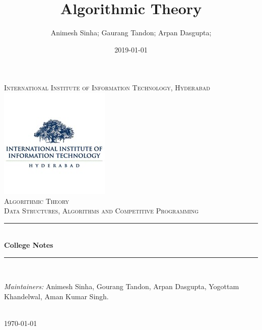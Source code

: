 \documentclass{book}
\title{Algorithmic Theory}
\date{2019-01-01}
\author{Animesh Sinha; Gaurang Tandon; Arpan Dasgupta; }
\newcounter{theo}[section]\setcounter{theo}{0}
\newcounter{prob}[section]\setcounter{prob}{0}
\begin{document}


\begin{titlepage}
    \newcommand{\HRule}{\rule{\linewidth}{0.5mm}}
    \center
    \textsc{\LARGE International Institute of Information Technology, Hyderabad}\\[0.5cm]
    \includegraphics[scale=1]{img/iiit-logo.jpeg}\\[0.5cm]
    \textsc{\Large Algorithmic Theory}\\[0.5cm]
    \textsc{\large Data Structures, Algorithms and Competitive Programming}\\[0.5cm] %
    \HRule \\[0.4cm]
    { \huge \bfseries College Notes}\\[0.4cm]
    \HRule \\[1.5cm]
    \begin{minipage}{0.6\textwidth}
    \begin{flushleft} \large
    \emph{Maintainers:} Animesh Sinha, Gourang Tandon, Arpan Dasgupta, Yogottam Khandelwal, Aman Kumar Singh.
    \end{flushleft}
    \end{minipage}\\[2cm]
    {\large \today}\\[2cm]
    \vfill
\end{titlepage}










\end{document}
